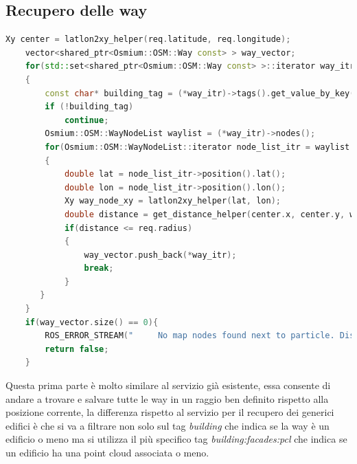 \subsection{Recupero delle way}
\begin{lstlisting}[caption={Recupero delle way con il tag inerente alla facciata.},captionpos=b,language=cpp]
 Xy center = latlon2xy_helper(req.latitude, req.longitude);
    vector<shared_ptr<Osmium::OSM::Way const> > way_vector;
    for(std::set<shared_ptr<Osmium::OSM::Way const> >::iterator way_itr = oh.m_ways.begin(); way_itr != oh.m_ways.end(); way_itr++
    {
        const char* building_tag = (*way_itr)->tags().get_value_by_key("building:facade:pcl");
        if (!building_tag)
            continue;
        Osmium::OSM::WayNodeList waylist = (*way_itr)->nodes();
        for(Osmium::OSM::WayNodeList::iterator node_list_itr = waylist.begin(); node_list_itr != waylist.end(); node_list_itr++ )
        {
            double lat = node_list_itr->position().lat();
            double lon = node_list_itr->position().lon();
            Xy way_node_xy = latlon2xy_helper(lat, lon);
            double distance = get_distance_helper(center.x, center.y, way_node_xy.x, way_node_xy.y);
            if(distance <= req.radius)
            {
                way_vector.push_back(*way_itr);
                break;
            }
       }
    }
    if(way_vector.size() == 0){
        ROS_ERROR_STREAM("     No map nodes found next to particle. Distance radius: " << req.radius << " m");
        return false;
    }
\end{lstlisting}{}

Questa prima parte è molto similare al servizio già esistente, essa consente di andare a trovare e salvare tutte le way in un raggio ben definito rispetto alla posizione corrente, la differenza rispetto al servizio per il recupero dei generici edifici è che si va a filtrare non solo sul tag \textit{building} che indica se la way è un edificio o meno ma si utilizza il più specifico tag \textit{building:facades:pcl} che indica se un edificio ha una point cloud associata o meno.
\newpage
